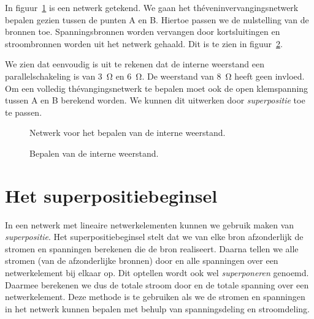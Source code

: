 \begin{example}
In figuur~\ref{fig:gelnetwerkvoorinterneweerstand} is een netwerk getekend. We gaan het th\'eveninvervangingsnetwerk bepalen gezien tussen de punten A en B. Hiertoe passen we
de nulstelling van de bronnen toe. Spanningsbronnen worden vervangen door kortsluitingen
en stroombronnen worden uit het netwerk gehaald. Dit is te zien in
figuur~\ref{fig:gelnetwerkvoorinterneweerstand2}.

We zien dat eenvoudig is uit te rekenen dat de interne weerstand een parallelschakeling is
van \SI{3}{\ohm} en \SI{6}{\ohm}. De weerstand van \SI{8}{\ohm} heeft geen invloed. Om een
volledig th\'evangingsnetwerk te bepalen moet ook de open klemspanning tussen A en B
berekend worden. We kunnen dit uitwerken door \textsl{superpositie} toe te passen.

\begin{figure}[H]
\centering
{}
\caption{Netwerk voor het bepalen van de interne weerstand.}
\label{fig:gelnetwerkvoorinterneweerstand}
\end{figure}
\begin{figure}[H]
\centering
{}
\caption{Bepalen van de interne weerstand.}
\label{fig:gelnetwerkvoorinterneweerstand2}
\end{figure}

\end{example}



\section{Het superpositiebeginsel}
\label{sec:gelsuperpositie}
In een netwerk met lineaire netwerkelementen kunnen we gebruik maken van 
\textsl{superpositie}. Het superpositiebeginsel stelt dat we van elke bron
afzonderlijk de stromen en spanningen berekenen die de bron realiseert.
Daarna tellen we alle stromen (van de afzonderlijke bronnen) door en
alle spanningen over een netwerkelement bij elkaar op. Dit optellen wordt
ook wel \textsl{superponeren} genoemd. Daarmee berekenen we dus de
totale stroom door en de totale spanning over een netwerkelement. Deze
methode is te gebruiken als we de stromen en spanningen in het netwerk
kunnen bepalen met behulp van spanningsdeling en stroomdeling.

